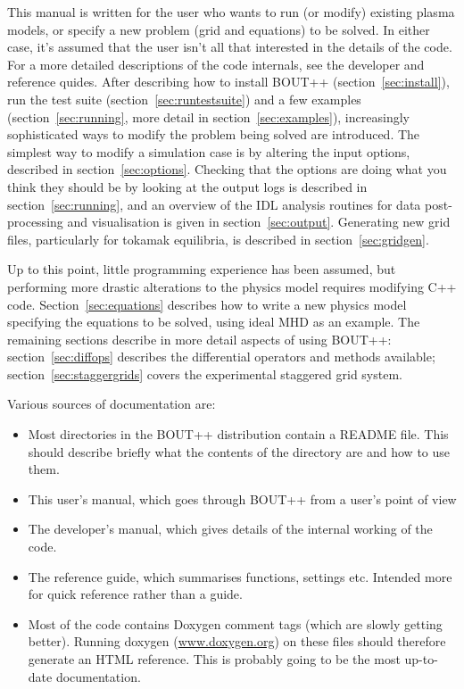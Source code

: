 \documentclass[12pt]{article}
\begin{document}
This manual is written for the user who wants to run (or modify) existing plasma models, or 
specify a new problem (grid and equations) to be solved. In either case, it's assumed that
the user isn't all that interested in the details of the code.
For a more detailed descriptions of the code internals, see the developer
and reference quides.
After describing how to install BOUT++ (section~\ref{sec:install}), run the test suite
(section~\ref{sec:runtestsuite}) and a few examples 
(section~\ref{sec:running}, more detail in section~\ref{sec:examples}), increasingly sophisticated ways to modify the problem being solved are introduced.
The simplest way to modify a simulation case is by altering the input options, described in
section~\ref{sec:options}. Checking that the options are doing what you think they should be
by looking at the output logs is described in section~\ref{sec:running}, and an overview of the IDL analysis routines
for data post-processing and visualisation is given in section~\ref{sec:output}.
Generating new grid files, particularly for tokamak equilibria, is described in section~\ref{sec:gridgen}.

Up to this point, little programming experience has been assumed, but performing more drastic
alterations to the physics model requires modifying C++ code.
Section~\ref{sec:equations} describes how to write a new physics model specifying the equations to be solved,
using ideal MHD as an example. The remaining sections describe in more detail aspects of using BOUT++:
section~\ref{sec:diffops} describes the differential operators and methods available; section~\ref{sec:staggergrids}
covers the experimental staggered grid system.

Various sources of documentation are:
\begin{itemize}
\item Most directories in the BOUT++ distribution contain a README file. This should
describe briefly what the contents of the directory are and how to use them.
\item This user's manual, which goes through BOUT++ from a user's point of view
\item The developer's manual, which gives details of the internal working of the code.
\item The reference guide, which summarises functions, settings etc. Intended more for
quick reference rather than a guide.
\item Most of the code contains Doxygen comment tags (which are slowly getting better). 
Running doxygen (\url{www.doxygen.org}) on these files should therefore generate an HTML
reference. This is probably going to be the most up-to-date documentation.
\end{itemize}
\end{document}
